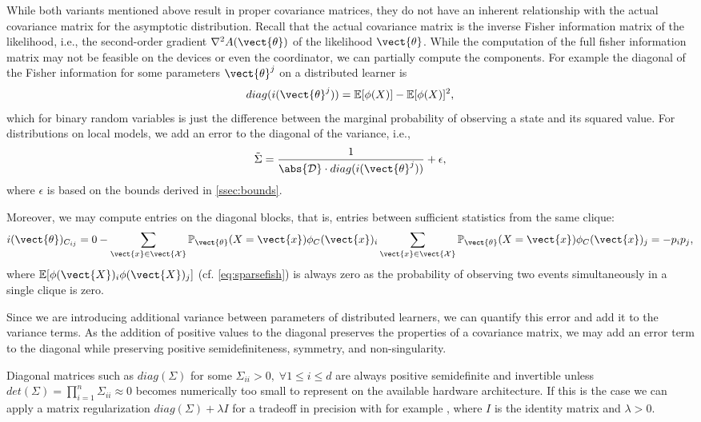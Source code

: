 While both variants mentioned above result in proper covariance matrices, they do not have an inherent relationship with the actual covariance matrix for the asymptotic distribution.
Recall that the actual covariance matrix is the inverse Fisher information matrix of the likelihood, i.e., the second-order gradient $\nabla^2 A(\vect{\theta})$ of the likelihood \wrt $\vect{\theta}$.
While the computation of the full fisher information matrix may not be feasible on the devices or even the coordinator, we can partially compute the components. 
For example the diagonal of the Fisher information for some parameters $\vect{\theta}^j$ on a distributed learner is 
\begin{equation}
    diag(i(\vect{\theta}^j)) = \mathbb{E}[\phi(X)] - \mathbb{E}[\phi(X)]^2,
\end{equation}
which for binary random variables is just the difference between the marginal probability of observing a state and its squared value.
For distributions on local models, we add an error to the diagonal of the variance, i.e.,
\begin{equation}
    \tilde{\Sigma}=  \frac{1}{\abs{\mathcal{D}} \cdot diag(i(\vect{\theta}^j))} + \epsilon,
\end{equation}
where $\epsilon$ is based on the bounds derived in \autoref{ssec:bounds}.

Moreover, we may compute entries on the diagonal blocks, that is, entries between sufficient statistics from the same clique:
\begin{equation}
    i(\vect{\theta})_{C_{ij}} = 0- \sum_{\vect{x} \in \vect{\mathcal{X}}} \mathbb{P}_{\vect{\theta}}(X= \vect{x}) \phi_C(\vect{x})_i \sum_{\vect{x} \in \vect{\mathcal{X}}} \mathbb{P}_{\vect{\theta}}(X= \vect{x}) \phi_C(\vect{x})_j= - p_i p_j,
\end{equation}
where $ \mathbb{E}[\phi(\vect{X})_i \phi(\vect{X})_j]$ (cf. \autoref{eq:sparsefish}) is always zero as the probability of observing two events simultaneously in a single clique is zero.

Since we are introducing additional variance between parameters of distributed learners, we can quantify this error and add it to the variance terms.
As the addition of positive values to the diagonal preserves the properties of a covariance matrix, we may add an error term to the diagonal while preserving positive semidefiniteness, symmetry, and non-singularity.

Diagonal matrices such as $diag(\Sigma)$ for some $\Sigma_{ii} > 0, \; \forall 1 \leq i \leq d$ are always positive semidefinite and invertible unless $det(\Sigma) = \prod_{i=1}^n \Sigma_{ii} \approx 0$ becomes numerically too small to represent on the available hardware architecture. 
If this is the case we can apply a matrix regularization $diag(\Sigma) + \lambda I$ for a tradeoff in precision with for example , where $I$ is the identity matrix and $\lambda > 0$.

